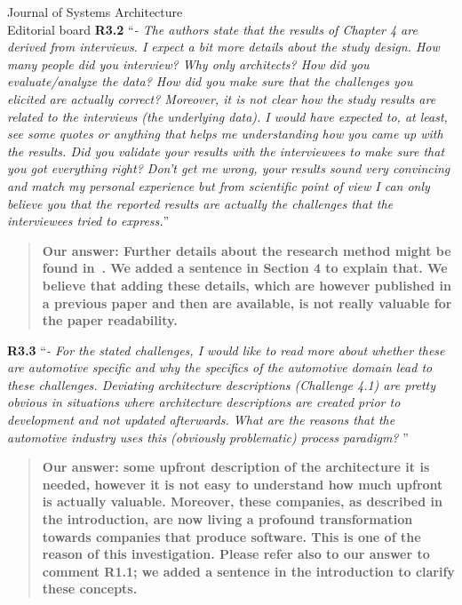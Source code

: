\documentclass[a4paper,10pt]{letter}
\begin{document}
\begin{letter}{Journal of Systems Architecture\\
    Editorial board}
\textbf{R3.2} ``\textit{- The authors state that the results of Chapter 4 are derived from interviews. I expect a bit more details about the study design. How many people did you interview? Why only architects? How did you evaluate/analyze the data? How did you make sure that the challenges you elicited are actually correct? Moreover, it is not clear how the study results are related to the interviews (the underlying data). I would have expected to, at least, see some quotes or anything that helps me understanding how you came up with the results. Did you validate your results with the interviewees to make sure that you got everything right? Don't get me wrong, your results sound very convincing and match my personal experience but from scientific point of view I can only believe you that the reported results are actually the challenges that the interviewees tried to express.}''
\begin{quote}
\textbf{Our answer: Further details about the research method might be found in~\cite{WICSA2015}. We added a sentence in Section 4 to explain that. We believe that adding these details, which are however published in a previous paper and then are available, is not really valuable for the paper readability.}
\end{quote}

\textbf{R3.3} ``\textit{- For the stated challenges, I would like to read more about whether these are automotive specific and why the specifics of the automotive domain lead to these challenges. Deviating architecture descriptions (Challenge 4.1) are pretty obvious in situations where architecture descriptions are created prior to development and not updated afterwards. What are the reasons that the automotive industry uses this (obviously problematic) process paradigm? }''
\begin{quote}
\textbf{Our answer: some upfront description of the architecture it is needed, however it is not easy to understand how much upfront is actually valuable. Moreover, these companies, as described in the introduction, are now living a profound transformation towards companies that produce software. This is one of the reason of this investigation. Please refer also to our answer to comment R1.1; we added a sentence in the introduction to clarify these concepts.}
\end{quote}


\end{letter}
\end{document}
